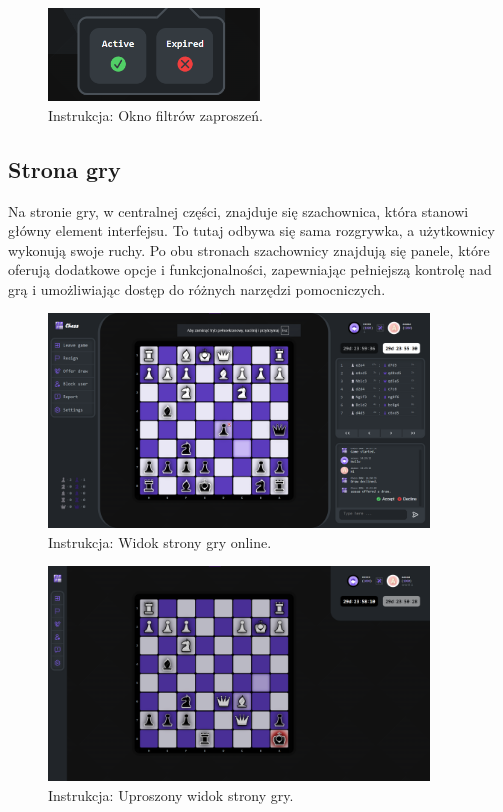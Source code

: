 \documentclass[12pt,a4paper]{article}
\begin{document}
\vspace{0.5cm}
\begin{figure}[h!]
    \centering
    \includegraphics[width=0.5\textwidth]{images/ins_filters.png}
    \caption{Instrukcja: Okno filtrów zaproszeń.}
\end{figure}

\newpage

\subsection{Strona gry}

Na stronie gry, w centralnej części, znajduje się szachownica, która stanowi główny element interfejsu. To tutaj odbywa się sama rozgrywka, a użytkownicy wykonują swoje ruchy. Po obu stronach szachownicy znajdują się panele, które oferują dodatkowe opcje i funkcjonalności, zapewniając pełniejszą kontrolę nad grą i umożliwiając dostęp do różnych narzędzi pomocniczych.

\vspace{1cm}
\begin{figure}[h!]
    \centering
    \includegraphics[width=0.9\textwidth]{images/ins_webgame.png}
    \caption{Instrukcja: Widok strony gry online.}
\end{figure}

\begin{figure}[h!]
    \centering
    \includegraphics[width=0.9\textwidth]{images/ins_simpgame.png}
    \caption{Instrukcja: Uproszony widok strony gry.}
\end{figure}
\end{document}
